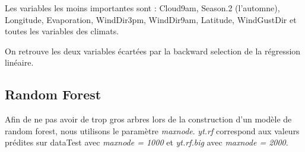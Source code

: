 \documentclass{article}
\begin{document}
Les variables les moins importantes sont : Cloud9am, Season.2 (l'automne), Longitude, Evaporation, WindDir3pm, WindDir9am, Latitude, WindGustDir et toutes les variables des climats.

On retrouve les deux variables écartées par la backward selection de la régression linéaire. 

\subsection{Random Forest}

Afin de ne pas avoir de trop gros arbres lors de la construction d'un modèle de random forest, nous utilisons le paramètre \emph{maxnode}. \emph{yt.rf} correspond aux valeurs prédites sur dataTest avec \emph{maxnode = 1000} et \emph{yt.rf.big} avec \emph{maxnode = 2000}. 
\end{document}
